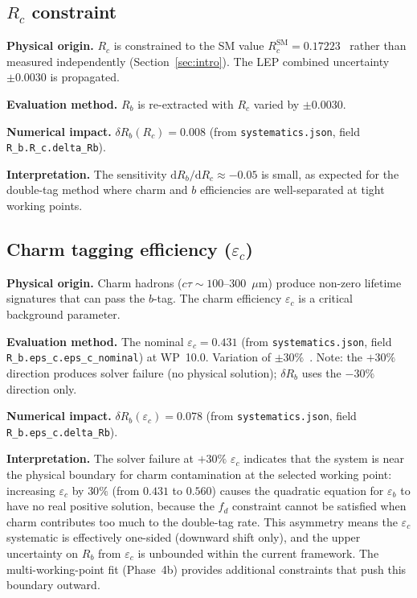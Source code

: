 \documentclass[11pt,a4paper]{article}
\begin{document}
\subsection{$R_c$ constraint}
\label{sec:syst_rc}

\textbf{Physical origin.} $R_c$ is constrained to the SM value
$R_c^\mathrm{SM} = 0.17223$~\cite{LEP:EWWG:2005} rather than measured independently
(Section~\ref{sec:intro}). The LEP combined uncertainty $\pm 0.0030$ is propagated.

\textbf{Evaluation method.} $R_b$ is re-extracted with $R_c$ varied by $\pm 0.0030$.

\textbf{Numerical impact.}
$\delta R_b(R_c) = 0.008$
(from \texttt{systematics.json}, field \texttt{R\_b.R\_c.delta\_Rb}).

\textbf{Interpretation.} The sensitivity $\mathrm{d}R_b/\mathrm{d}R_c \approx -0.05$
is small, as expected for the double-tag method where charm and $b$ efficiencies are
well-separated at tight working points.

\subsection{Charm tagging efficiency ($\varepsilon_c$)}
\label{sec:syst_eps_c}

\textbf{Physical origin.} Charm hadrons ($c\tau \sim 100$--300~$\mu$m) produce
non-zero lifetime signatures that can pass the $b$-tag. The charm efficiency
$\varepsilon_c$ is a critical background parameter.

\textbf{Evaluation method.} The nominal $\varepsilon_c = 0.431$
(from \texttt{systematics.json}, field \texttt{R\_b.eps\_c.eps\_c\_nominal})
at WP~10.0. Variation of $\pm 30\%$~\cite{LEP:HF:2001}. Note: the $+30\%$ direction
produces solver failure (no physical solution); $\delta R_b$ uses the $-30\%$ direction
only.

\textbf{Numerical impact.}
$\delta R_b(\varepsilon_c) = 0.078$
(from \texttt{systematics.json}, field \texttt{R\_b.eps\_c.delta\_Rb}).

\textbf{Interpretation.} The solver failure at $+30\%$ $\varepsilon_c$ indicates
that the system is near the physical boundary for charm contamination at the
selected working point: increasing $\varepsilon_c$ by $30\%$ (from $0.431$ to
$0.560$) causes the quadratic equation for $\varepsilon_b$ to have no real
positive solution, because the $f_d$ constraint cannot be satisfied when charm
contributes too much to the double-tag rate. This asymmetry means the
$\varepsilon_c$ systematic is effectively one-sided (downward shift only), and
the upper uncertainty on $R_b$ from $\varepsilon_c$ is unbounded within the
current framework. The multi-working-point fit (Phase~4b) provides additional
constraints that push this boundary outward.
\end{document}
